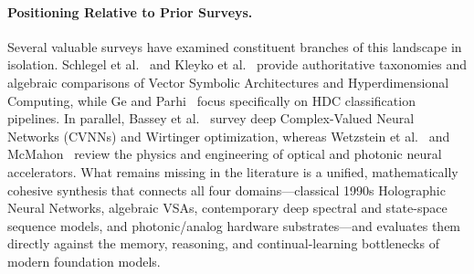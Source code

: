 \paragraph{Positioning Relative to Prior Surveys.}
Several valuable surveys have examined constituent branches of this landscape in isolation.
Schlegel et al.~\cite{SCHLEGEL_VSA_COMPARISON} and Kleyko et al.~\cite{KLEYKO_VSA_SURVEY} provide authoritative taxonomies and algebraic comparisons of Vector Symbolic Architectures and Hyperdimensional Computing, while Ge and Parhi~\cite{GE_2020_HDC_CLASSIFICATION} focus specifically on HDC classification pipelines.
In parallel, Bassey et al.~\cite{BASSEY_CVNN_SURVEY} survey deep Complex-Valued Neural Networks (CVNNs) and Wirtinger optimization, whereas Wetzstein et al.~\cite{WETZSTEIN_2020_OPTICAL_AI} and McMahon~\cite{MCMAHON_2023_PHYSICS_OPTICAL_NN} review the physics and engineering of optical and photonic neural accelerators.
What remains missing in the literature is a unified, mathematically cohesive synthesis that connects all four domains---classical 1990s Holographic Neural Networks, algebraic VSAs, contemporary deep spectral and state-space sequence models, and photonic/analog hardware substrates---and evaluates them directly against the memory, reasoning, and continual-learning bottlenecks of modern foundation models.

